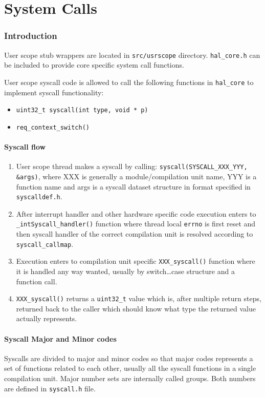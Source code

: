 \part{System Calls}

\section{Introduction}
User scope stub wrappers are located in \verb+src/usrscope+ directory.
\verb+hal_core.h+ can be included to provide core specific system call
functions.

User scope syscall code is allowed to call the following functions in
\verb+hal_core+ to implement syscall functionality:

\begin{itemize}
  \item \verb+uint32_t syscall(int type, void * p)+
  \item \verb+req_context_switch()+
\end{itemize}

\subsection{Syscall flow}

\begin{enumerate}
\item User scope thread makes a syscall by calling:
      \verb+syscall(SYSCALL_XXX_YYY, &args)+, where XXX is generally a
      module/compilation unit name, YYY is a function name and args is a
      syscall dataset structure in format specified in \verb+syscalldef.h+.

\item After interrupt handler and other hardware specific code execution enters
      to \verb+_intSyscall_handler()+ function where thread local \verb+errno+
      is first reset and then syscall handler of the correct compilation unit is
      resolved according to \verb+syscall_callmap+.

\item Execution enters to compilation unit specific \verb+XXX_syscall()+
      function where it is handled any way wanted, usually by switch\ldots case
      structure and a function call.

\item \verb+XXX_syscall()+ returns a \verb+uint32_t+ value which is, after
      multiple return steps, returned back to the caller which should know
      what type the returned value actually represents.
\end{enumerate}


\subsection{Syscall Major and Minor codes}

Syscalls are divided to major and minor codes so that major codes represents a
set of functions related to each other, usually all the syscall functions in a
single compilation unit. Major number sets are internally called groups. Both
numbers are defined in \verb+syscall.h+ file.

